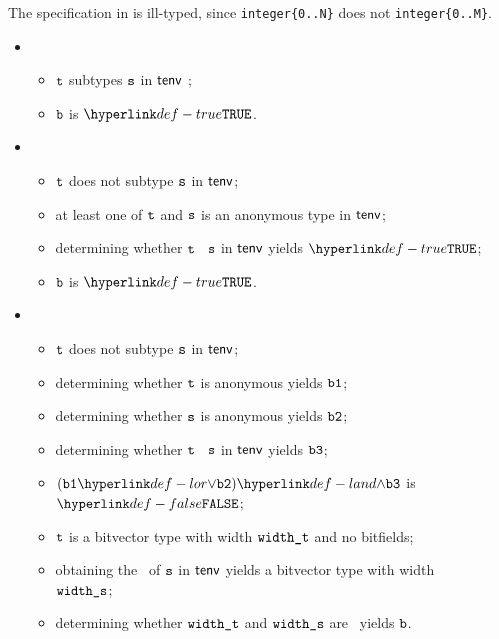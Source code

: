 The specification in  is ill-typed,
since \verb|integer{0..N}| does not \typesatisfy{} \verb|integer{0..M}|.

\ProseParagraph
\OneApplies
 \begin{itemize}
  \item {}
    \begin{itemize}
    \item $\texttt{t}$ subtypes $\texttt{s}$ in $\textsf{tenv}$ ;
    \item $\texttt{b}$ is $\True$.
  \end{itemize}

  \item {}
  \begin{itemize}
    \item $\texttt{t}$ does not subtype $\texttt{s}$ in $\textsf{tenv}$;
    \item at least one of $\texttt{t}$ and $\texttt{s}$ is an anonymous type in $\textsf{tenv}$;
    \item determining whether $\texttt{t}$ \subtypesatisfies\ $\texttt{s}$ in $\textsf{tenv}$ yields $\True$\ProseOrTypeError;
    \item $\texttt{b}$ is $\True$.
  \end{itemize}

  \item {}
  \begin{itemize}
    \item $\texttt{t}$ does not subtype $\texttt{s}$ in $\textsf{tenv}$;
    \item determining whether $\texttt{t}$ is anonymous yields $\texttt{b1}$;
    \item determining whether $\texttt{s}$ is anonymous yields $\texttt{b2}$;
    \item determining whether $\texttt{t}$ \subtypesatisfies\ $\texttt{s}$ in $\textsf{tenv}$ yields $\texttt{b3}$;
    \item $(\vbone \lor \vbtwo) \land \vbthree$ is $\False$;
    \item $\texttt{t}$ is a bitvector type with width $\texttt{width\_t}$ and no bitfields;
    \item obtaining the \structure\ of $\texttt{s}$ in $\textsf{tenv}$ yields a bitvector type with width \\
          $\texttt{width\_s}$\ProseOrTypeError;
    \item determining whether $\texttt{width\_t}$ and $\texttt{width\_s}$ are \bitwidthequivalent\ yields $\texttt{b}$.
  \end{itemize}


\end{itemize}
